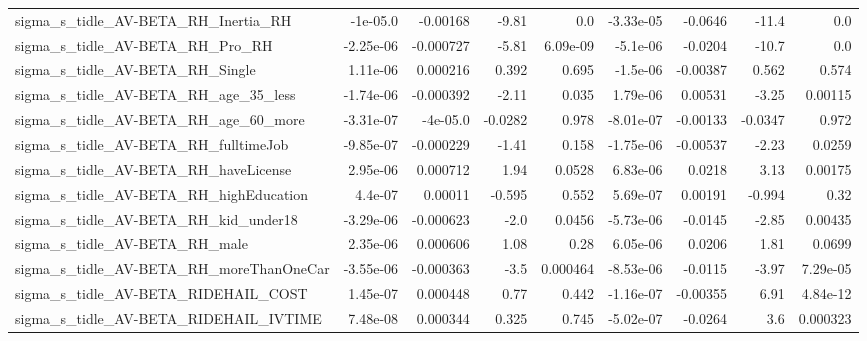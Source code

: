 \begin{tabular}{lrrrrrrrr}
sigma\_s\_tidle\_AV-BETA\_RH\_Inertia\_RH                &    -1e-05.0 &     -0.00168 &    -9.81 &      0.0 &  -3.33e-05 &     -0.0646 &        -11.4 &           0.0 \\
sigma\_s\_tidle\_AV-BETA\_RH\_Pro\_RH                    &   -2.25e-06 &    -0.000727 &    -5.81 & 6.09e-09 &   -5.1e-06 &     -0.0204 &        -10.7 &           0.0 \\
sigma\_s\_tidle\_AV-BETA\_RH\_Single                    &    1.11e-06 &     0.000216 &    0.392 &    0.695 &   -1.5e-06 &    -0.00387 &        0.562 &         0.574 \\
sigma\_s\_tidle\_AV-BETA\_RH\_age\_35\_less               &   -1.74e-06 &    -0.000392 &    -2.11 &    0.035 &   1.79e-06 &     0.00531 &        -3.25 &       0.00115 \\
sigma\_s\_tidle\_AV-BETA\_RH\_age\_60\_more               &   -3.31e-07 &     -4e-05.0 &  -0.0282 &    0.978 &  -8.01e-07 &    -0.00133 &      -0.0347 &         0.972 \\
sigma\_s\_tidle\_AV-BETA\_RH\_fulltimeJob               &   -9.85e-07 &    -0.000229 &    -1.41 &    0.158 &  -1.75e-06 &    -0.00537 &        -2.23 &        0.0259 \\
sigma\_s\_tidle\_AV-BETA\_RH\_haveLicense               &    2.95e-06 &     0.000712 &     1.94 &   0.0528 &   6.83e-06 &      0.0218 &         3.13 &       0.00175 \\
sigma\_s\_tidle\_AV-BETA\_RH\_highEducation             &     4.4e-07 &      0.00011 &   -0.595 &    0.552 &   5.69e-07 &     0.00191 &       -0.994 &          0.32 \\
sigma\_s\_tidle\_AV-BETA\_RH\_kid\_under18               &   -3.29e-06 &    -0.000623 &     -2.0 &   0.0456 &  -5.73e-06 &     -0.0145 &        -2.85 &       0.00435 \\
sigma\_s\_tidle\_AV-BETA\_RH\_male                      &    2.35e-06 &     0.000606 &     1.08 &     0.28 &   6.05e-06 &      0.0206 &         1.81 &        0.0699 \\
sigma\_s\_tidle\_AV-BETA\_RH\_moreThanOneCar            &   -3.55e-06 &    -0.000363 &     -3.5 & 0.000464 &  -8.53e-06 &     -0.0115 &        -3.97 &      7.29e-05 \\
sigma\_s\_tidle\_AV-BETA\_RIDEHAIL\_COST                &    1.45e-07 &     0.000448 &     0.77 &    0.442 &  -1.16e-07 &    -0.00355 &         6.91 &      4.84e-12 \\
sigma\_s\_tidle\_AV-BETA\_RIDEHAIL\_IVTIME              &    7.48e-08 &     0.000344 &    0.325 &    0.745 &  -5.02e-07 &     -0.0264 &          3.6 &      0.000323 \\

\end{tabular}
